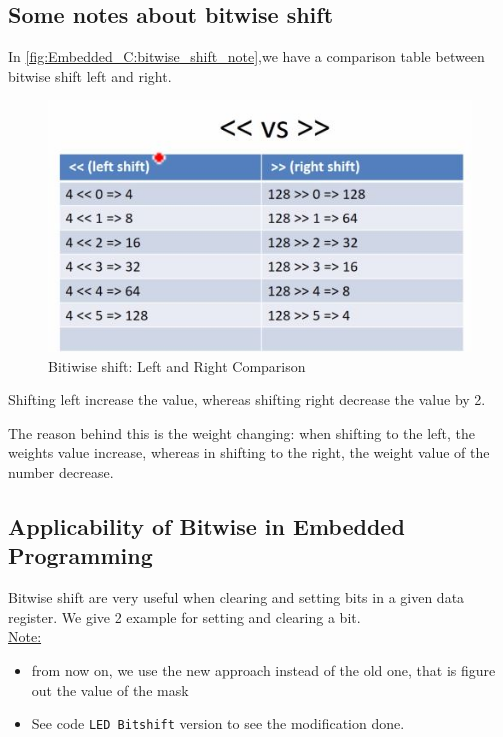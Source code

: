 \newpage
\subsection{Some notes about bitwise shift}

In \autoref{fig:Embedded_C:bitwise_shift_note},we have a comparison table between bitwise shift left and right.

\begin{figure}[h]
\centering
\includegraphics[scale=0.7]{Figures/Embedded_C/bitwise_shift_note}
\caption{Bitiwise shift: Left and Right Comparison}
\label{fig:Embedded_C:bitwise_shift_note}
\end{figure}

Shifting left increase the value, whereas shifting right decrease the  value by 2.

The reason behind this is the weight changing: when shifting to the left, the weights value increase, whereas in shifting to the right, the weight value of the number decrease.

\newpage
\subsection{Applicability of Bitwise in Embedded Programming}
\label{sub:BitwiseLeft_app}

Bitwise shift are very useful when clearing and setting bits in a given data register. We give 2 example for setting and clearing a bit.\\

\underline{Note:} 

\begin{itemize}

\item from now on, we use the new approach instead of the old one, that is figure out the value of the mask 

\item See code \verb|LED Bitshift| version to see the modification done.


\end{itemize}

